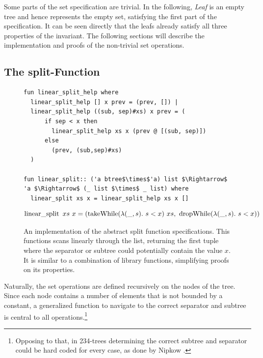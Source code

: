 Some parts of the set specification are trivial.
In the following, \textit{Leaf} is an empty tree and hence represents
the empty set, satisfying the first part of the specification.
It can be seen directly that the leafs already satisfy all three 
properties of the invariant.
The following sections will describe the implementation 
and proofs of the non-trivial set operations.

\subsection{The split-Function}

\begin{figure}
    
\begin{lstlisting}[mathescape=true, language=Isabelle]
fun linear_split_help where
  linear_split_help [] x prev = (prev, []) |
  linear_split_help ((sub, sep)#xs) x prev = (
      if sep < x then
        linear_split_help xs x (prev @ [(sub, sep)])
      else
        (prev, (sub,sep)#xs)
  )

fun linear_split:: ('a btree$\times$'a) list $\Rightarrow$ 'a $\Rightarrow$ (_ list $\times$ _ list) where
  linear_split xs x = linear_split_help xs x []
\end{lstlisting}
\begin{lemma}
    \begin{equation*}
    \operatorname{linear\_split}\ xs\ x = (\operatorname{takeWhile} (\lambda(\_,s).\ s < x)\ xs,\ \operatorname{dropWhile} (\lambda(\_,s).\ s < x))
    \end{equation*}
\end{lemma}
\caption[An implementation of the abstract split function specifications.]
{An implementation of the abstract split function specifications.
This functions scans linearly through the list, returning the first tuple where the separator
or subtree could potentially contain the value $x$.
It is similar to a combination of library functions, simplifying proofs on its properties.}
\label{fig:linear_split}

\end{figure}

Naturally, the set operations are defined recursively on the nodes of the tree.
Since each node contains a number of elements that is not bounded by a constant,
a generalized function to navigate to the correct separator and subtree
is central to all operations.\footnote{
    Opposing to that, in 234-trees determining the correct subtree
    and separator could be hard coded for every case, as done by Nipkow \parencite{DBLP:conf/itp/Nipkow16}.
}

